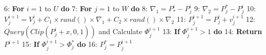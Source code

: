 \documentclass[lettersize,journal]{IEEEtran}
\begin{document}
\begin{algorithm}[tb]
\begin{small}
\begin{algorithmic}[0]
				\STATE \hspace{-0.3cm} {\small 6:} \hspace{-0.05cm}  \hspace{0.0cm} \textbf{For} $i=1$ to $U$ \textbf{do}
				\STATE \hspace{-0.3cm} {\small 7:} \hspace{-0.05cm}  \hspace{0.25cm} \textbf{For} $j=1$ to $W$ \textbf{do} 
				\STATE \hspace{-0.3cm} {\small 8:} \hspace{-0.05cm}  \hspace{0.85cm}  $\nabla_1=P^i_\ast-P^i_j$	
				\STATE \hspace{-0.3cm} {\small 9:} \hspace{-0.05cm}  \hspace{0.85cm}  $\nabla_2=P^\ast_j-P^i_j$	
				\STATE \hspace{-0.3cm} {\small 10:} \hspace{-0.05cm}  \hspace{0.80cm}  $V^{i+1}_j=V^i_j+C_1 \times rand()\times\nabla_1 +C_2 \times rand()\times\nabla_2 $	
				\STATE \hspace{-0.3cm} {\small 11:} \hspace{-0.05cm}  \hspace{0.70cm} $P^{i+1}_{j}=P^i_j+v^{i+1}_j$	
				\STATE \hspace{-0.3cm} {\small 12:} \hspace{-0.05cm}  \hspace{0.75cm} $Query(Clip(P^i_j+x,0,1))$ and Calculate $\Phi^{i+1}_j$  %
				\STATE \hspace{-0.3cm} {\small 13:} \hspace{-0.05cm}  \hspace{0.75cm} \textbf{If} $\Phi^{i+1}_j > 1$ \textbf{do}
				\STATE \hspace{-0.3cm} {\small 14:} \hspace{-0.05cm}  \hspace{1cm} 	\textbf{Return}  $P^{i+1}$
				\STATE \hspace{-0.3cm} {\small 15:} \hspace{-0.05cm}  \hspace{0.75cm} \textbf{If} $\Phi^{i+1}_j>\Phi^\ast_j$ \textbf{do}
				\STATE \hspace{-0.3cm} {\small 16:} \hspace{-0.05cm}  \hspace{1cm} 	$P^\ast_j=P^{i+1}_{j}$

\end{algorithmic}
\end{small}
\end{algorithm}
\end{document}
